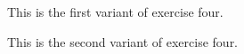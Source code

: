 \begin{exercise}
This is the first variant of exercise four.
\end{exercise}

\begin{exercise}
This is the second variant of exercise four.
\end{exercise}